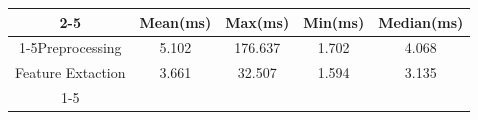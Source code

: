 \documentclass{standalone}
\begin{document}
 
 \begin{tabular}{|c |c |c |c |c |}
\cline{2-5}\cline{2-5} \multicolumn{1}{c |}{ } & Mean(ms) & Max(ms) & Min(ms) & Median(ms)\\ 
\cline{1-5}Preprocessing & 5.102 & 176.637 & 1.702 & 4.068\\ 
 \hhline{|=|=|=|=|=|}Feature Extaction & 3.661 & 32.507 & 1.594 & 3.135\\ 
 \cline{1-5}\hline \end{tabular}
 
\end{document}
